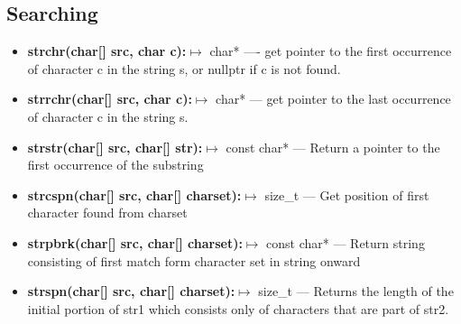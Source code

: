\documentclass{report}
\begin{document}
    \bigbreak \noindent 
    \subsection{Searching}
    \begin{itemize}
        \item \textbf{strchr(char[] src, char c):}$\mapsto$ char* ---- get pointer to the first occurrence of character c in the string s, or nullptr if c is not found.
        \item \textbf{strrchr(char[] src, char c):}$\mapsto$ char* --- get pointer to the last occurrence of character c in the string s.
        \item \textbf{strstr(char[] src, char[] str):}$\mapsto$ const char* --- Return a pointer to the first occurrence of the substring 
        \item \textbf{strcspn(char[] src, char[] charset):}$\mapsto$ size\_t --- Get position of first character found from charset 
        \item \textbf{strpbrk(char[] src, char[] charset):}$\mapsto$ const char* --- Return string consisting of first match form character set in string onward
        \item \textbf{strspn(char[] src, char[] charset):}$\mapsto$ size\_t --- Returns the length of the initial portion of str1 which consists only of characters that are part of str2.
    \end{itemize}

    \bigbreak \noindent 
\end{document}
